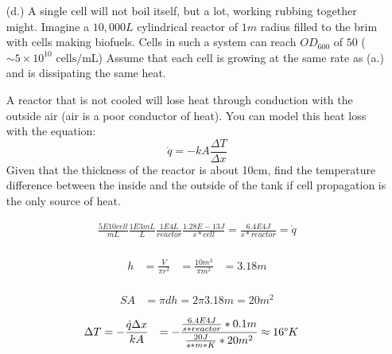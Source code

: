 \documentclass[11pt]{article}
\begin{document}
\begin{itemize}
 \item[(d.)] A single cell will not boil itself, but a lot, working rubbing together might. Imagine a $10,000L$ cylindrical reactor of $1m$ radius filled to the brim with cells making biofuels. Cells in such a system can reach $OD_600$ of $50$ ($\sim 5\times 10^{10} \mbox{ cells/mL}$) Assume that each cell is growing at the same rate as (a.) and is dissipating the same heat.

A reactor that is not cooled will lose heat through conduction with the outside air (air is a poor conductor of heat). You can model this heat loss with the equation: 
$$\dot q = -kA\frac{\Delta T}{\Delta x} $$
Given that the thickness of the reactor is about 10cm, find the temperature difference between the inside and the outside of the tank if cell propagation is the only source of heat. 

\begin{equation*}
  \begin{aligned}
    \frac{5E10cell}{mL}\frac{1E3mL}{L}\frac{1E4L}{reactor}\frac{1.28E-13J}{s*cell}=\frac{6.4E4J}{s*reactor}=\dot q \\
  \end{aligned}
\end{equation*}

\begin{equation*}
  \begin{aligned}
  h&=\frac{V}{\pi r^2}
   &=\frac{10m^3}{\pi m^2}
   &=3.18m\\
  \end{aligned}
\end{equation*}

\begin{equation*}
  \begin{aligned}
    SA&=\pi d h = 2\pi 3.18m=20m^2
  \end{aligned}
\end{equation*}

\begin{equation*}
  \begin{aligned}
    \Delta T &= -\frac{\dot{q}\Delta x}{kA}
             &= -\frac{\frac{6.4E4J}{s*reactor}* 0.1m}{\frac{20J}{s*m*K} * 20m^2}
             &\approx 16\degree K
  \end{aligned}
\end{equation*}
\end{itemize}
\end{document}
